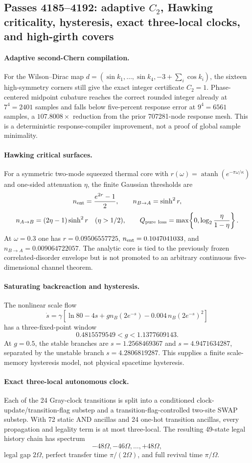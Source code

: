 \subsection*{Passes 4185--4192: adaptive $C_2$, Hawking criticality, hysteresis, exact three-local clocks, and high-girth covers}
\paragraph{Adaptive second-Chern compilation.}
For the Wilson--Dirac map $d=(\sin k_1,\ldots,\sin k_4,-3+\sum_i\cos k_i)$, the sixteen high-symmetry corners still give the exact integer certificate $C_2=1$. Phase-centered midpoint cubature reaches the correct rounded integer already at $7^4=2401$ samples and falls below five-percent response error at $9^4=6561$ samples, a $107.8008\times$ reduction from the prior 707281-node response mesh. This is a deterministic response-compiler improvement, not a proof of global sample minimality.

\paragraph{Hawking critical surfaces.}
For a symmetric two-mode squeezed thermal core with $r(\omega)=\operatorname{atanh}(e^{-\pi\omega/\kappa})$ and one-sided attenuation $\eta$, the finite Gaussian thresholds are
\[
n_{\rm ent}=\frac{e^{2r}-1}{2},\qquad n_{B\to A}=\sinh^2r,
\]
\[
n_{A\to B}=(2\eta-1)\sinh^2r\quad(\eta>1/2),\qquad
Q_{\rm pure\ loss}=\max\!\left\{0,\log_2\frac{\eta}{1-\eta}\right\}.
\]
At $\omega=0.3$ one has $r=0.09506557725$, $n_{\rm ent}=0.1047041033$, and $n_{B\to A}=0.009064722057$. The analytic core is tied to the previously frozen correlated-disorder envelope but is not promoted to an arbitrary continuous five-dimensional channel theorem.

\paragraph{Saturating backreaction and hysteresis.}
The nonlinear scale flow
\[
\dot s=\gamma\left[\ln80-4s+g n_B(2e^{-s})-0.004\,n_B(2e^{-s})^2\right]
\]
has a three-fixed-point window
\[
0.4815579549<g<1.1377609143.
\]
At $g=0.5$, the stable branches are $s=1.2568469367$ and $s=4.9471634287$, separated by the unstable branch $s=4.2806819287$. This supplies a finite scale-memory hysteresis model, not physical spacetime hysteresis.

\paragraph{Exact three-local autonomous clock.}
Each of the 24 Gray-clock transitions is split into a conditioned clock-update/transition-flag substep and a transition-flag-controlled two-site SWAP substep. With 72 static AND ancillas and 24 one-hot transition ancillas, every propagation and legality term is at most three-local. The resulting 49-state legal history chain has spectrum
\[
-48\Omega,-46\Omega,\ldots,+48\Omega,
\]
legal gap $2\Omega$, perfect transfer time $\pi/(2\Omega)$, and full revival time $\pi/\Omega$.

